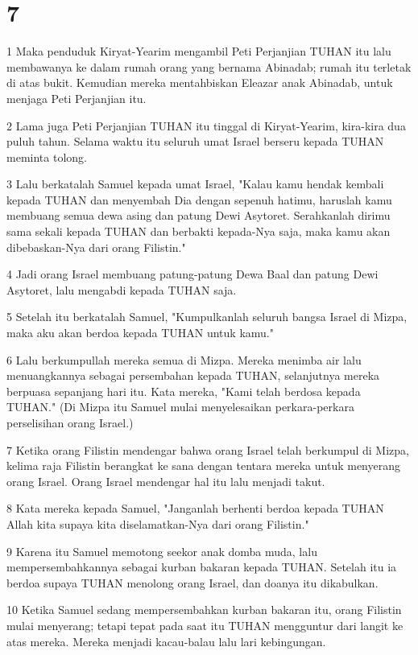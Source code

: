 \chapter{7}

\par 1 Maka penduduk Kiryat-Yearim mengambil Peti Perjanjian TUHAN itu lalu membawanya ke dalam rumah orang yang bernama Abinadab; rumah itu terletak di atas bukit. Kemudian mereka mentahbiskan Eleazar anak Abinadab, untuk menjaga Peti Perjanjian itu.
\par 2 Lama juga Peti Perjanjian TUHAN itu tinggal di Kiryat-Yearim, kira-kira dua puluh tahun. Selama waktu itu seluruh umat Israel berseru kepada TUHAN meminta tolong.
\par 3 Lalu berkatalah Samuel kepada umat Israel, "Kalau kamu hendak kembali kepada TUHAN dan menyembah Dia dengan sepenuh hatimu, haruslah kamu membuang semua dewa asing dan patung Dewi Asytoret. Serahkanlah dirimu sama sekali kepada TUHAN dan berbakti kepada-Nya saja, maka kamu akan dibebaskan-Nya dari orang Filistin."
\par 4 Jadi orang Israel membuang patung-patung Dewa Baal dan patung Dewi Asytoret, lalu mengabdi kepada TUHAN saja.
\par 5 Setelah itu berkatalah Samuel, "Kumpulkanlah seluruh bangsa Israel di Mizpa, maka aku akan berdoa kepada TUHAN untuk kamu."
\par 6 Lalu berkumpullah mereka semua di Mizpa. Mereka menimba air lalu menuangkannya sebagai persembahan kepada TUHAN, selanjutnya mereka berpuasa sepanjang hari itu. Kata mereka, "Kami telah berdosa kepada TUHAN." (Di Mizpa itu Samuel mulai menyelesaikan perkara-perkara perselisihan orang Israel.)
\par 7 Ketika orang Filistin mendengar bahwa orang Israel telah berkumpul di Mizpa, kelima raja Filistin berangkat ke sana dengan tentara mereka untuk menyerang orang Israel. Orang Israel mendengar hal itu lalu menjadi takut.
\par 8 Kata mereka kepada Samuel, "Janganlah berhenti berdoa kepada TUHAN Allah kita supaya kita diselamatkan-Nya dari orang Filistin."
\par 9 Karena itu Samuel memotong seekor anak domba muda, lalu mempersembahkannya sebagai kurban bakaran kepada TUHAN. Setelah itu ia berdoa supaya TUHAN menolong orang Israel, dan doanya itu dikabulkan.
\par 10 Ketika Samuel sedang mempersembahkan kurban bakaran itu, orang Filistin mulai menyerang; tetapi tepat pada saat itu TUHAN mengguntur dari langit ke atas mereka. Mereka menjadi kacau-balau lalu lari kebingungan.

